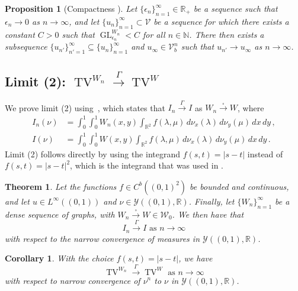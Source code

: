 \documentclass[11pt]{amsart}
\newtheorem{corollary}{Corollary}
\newtheorem{theorem}{Theorem}[section]
\newtheorem{proposition}{Proposition}[section]
\def\R{\mathbb{R}}
\def\N{\mathbb{N}}
\def\ep{\epsilon}
\def\ra{\rightarrow}
\def\gamra{\stackrel{\Gamma}{\longrightarrow}}
\def\sqra{\stackrel{\square}{\longrightarrow}}
\def\GL{\operatorname{GL}}
\def\TV{\operatorname{TV}}
\numberwithin{equation}{section}
\begin{document}
{{\begin{proposition}[{Compactness} {\cite[Theorem 3.2]{van2012gamma}}]\label{prop: compactness limit 1}
     Let $\{\ep_n\}_{n=1}^\infty \in \R_+$ be a sequence such that $\ep_n \ra 0$ as $n\ra \infty$, and let $\{u_n\}_{n=1}^\infty \subset \mathcal{V}$ be a sequence for which there exists a constant $C > 0$ such that $\GL^{W_n}_{\ep_n} < C$ for all $n \in \N$. There then exists a subsequence $\{u_{n'}\}_{n'=1}^\infty \subseteq \{u_n\}_{n=1}^\infty$ and $u_\infty \in \mathcal{V}^n_b$ such that $u_{n'} \ra u_\infty$ as $n\ra \infty$. 
\end{proposition} 




\subsection{\texorpdfstring{Limit (2): $\TV^{W_n} \gamra \TV^W$}{Limit (2)}} \label{sec: limit (2)}

We prove limit (2) using~\cite[Theorem 12]{braides2020cut}, which states that $I_n \gamra I$ as $W_n \sqra W$, where
\begin{align}
	I_n(\nu) &= \int_0^1\int_0^1 W_n(x,y) \int_{\R^2} f(\lambda, \mu) \,d\nu_x(\lambda) \,d\nu_y(\mu) \,dx\,dy \,, \\
	I(\nu) &= \int_0^1\int_0^1 W(x,y) \int_{\R^2} f(\lambda, \mu) \,d\nu_x(\lambda) \,d\nu_y(\mu) \,dx\,dy \,.
\end{align}	
Limit (2) follows directly by using the integrand $f(s,t) = |s - t|$ instead of $f(s,t) = |s - t|^2$, which is the integrand that {was} used in \cite[Theorem 12]{braides2020cut}. 


\begin{theorem}\cite[Theorem 12]{braides2020cut}
Let the functions $f \in C^b((0,1)^2)$ be bounded and continuous, and let $u \in L^\infty((0,1))$ and $\nu \in \mathcal{Y}((0,1),\R)$. Finally, let $\{W_n\}_{n=1}^\infty$ be a {dense sequence of graphs,}
with $W_n \sqra W\in \mathcal{W}_0$. We then have that
\begin{equation}
	I_n \gamra I \text{ as } n\ra \infty
\end{equation}
with respect to the narrow convergence of measures in $\mathcal{Y}((0,1),\R)$. 
\end{theorem}


\begin{corollary}
With the choice $f(s,t) = |s - t|$, we have 
\begin{equation}
     \TV^{W_n} \gamra \TV^{W} \text{ as } n \ra \infty 
\end{equation}    
with respect to narrow convergence of {$\nu^n$} to $\nu$ in $\mathcal{Y}((0,1),\R)$. 
\end{corollary}


}}
\end{document}
